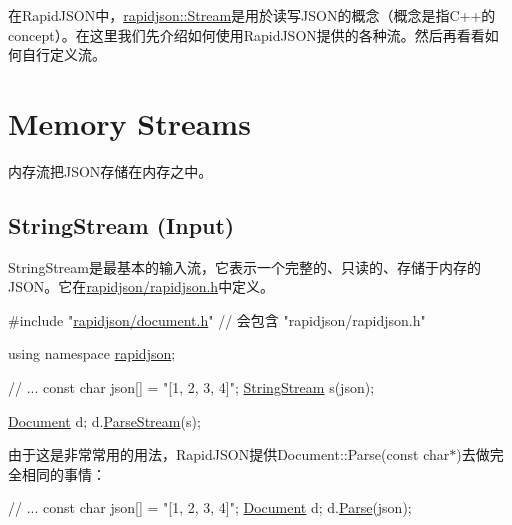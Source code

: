 在\+Rapid\+J\+S\+O\+N中，{\ttfamily \hyperlink{classrapidjson_1_1_stream}{rapidjson\+::\+Stream}}是用於读写\+J\+S\+O\+N的概念（概念是指\+C++的concept）。在这里我们先介绍如何使用\+Rapid\+J\+S\+O\+N提供的各种流。然后再看看如何自行定义流。\hypertarget{md_Cadriciel_Commun_Externe_RapidJSON_doc_stream.zh-cn_MemoryStreams}{}\section{Memory Streams}\label{md_Cadriciel_Commun_Externe_RapidJSON_doc_stream.zh-cn_MemoryStreams}
内存流把\+J\+S\+O\+N存储在内存之中。\hypertarget{md_Cadriciel_Commun_Externe_RapidJSON_doc_stream.zh-cn_StringStream}{}\subsection{String\+Stream (\+Input)}\label{md_Cadriciel_Commun_Externe_RapidJSON_doc_stream.zh-cn_StringStream}
{\ttfamily String\+Stream}是最基本的输入流，它表示一个完整的、只读的、存储于内存的\+J\+S\+O\+N。它在{\ttfamily \hyperlink{rapidjson_8h}{rapidjson/rapidjson.\+h}}中定义。


\begin{DoxyCode}
\textcolor{preprocessor}{#include "\hyperlink{document_8h}{rapidjson/document.h}"} \textcolor{comment}{// 会包含 "rapidjson/rapidjson.h"}

\textcolor{keyword}{using namespace }\hyperlink{namespacerapidjson}{rapidjson};

\textcolor{comment}{// ...}
\textcolor{keyword}{const} \textcolor{keywordtype}{char} json[] = \textcolor{stringliteral}{"[1, 2, 3, 4]"};
\hyperlink{struct_generic_string_stream}{StringStream} s(json);

\hyperlink{class_generic_document}{Document} d;
d.\hyperlink{class_generic_document_afe94c0abc83a20f2d7dc1ba7677e6238}{ParseStream}(s);
\end{DoxyCode}


由于这是非常常用的用法，\+Rapid\+J\+S\+O\+N提供{\ttfamily Document\+::\+Parse(const char$\ast$)}去做完全相同的事情：


\begin{DoxyCode}
\textcolor{comment}{// ...}
\textcolor{keyword}{const} \textcolor{keywordtype}{char} json[] = \textcolor{stringliteral}{"[1, 2, 3, 4]"};
\hyperlink{class_generic_document}{Document} d;
d.\hyperlink{class_generic_document_aebd4e7fddd80c1e1174837aee6d2159b}{Parse}(json);
\end{DoxyCode}


